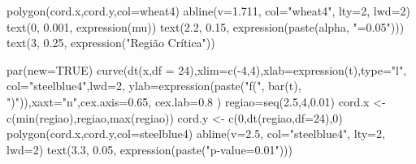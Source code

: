 \documentclass[
  letterpaper,
  DIV=11,
  numbers=noendperiod]{scrartcl}
\newenvironment{Shaded}{\begin{snugshade}}{\end{snugshade}}
\newcommand{\AttributeTok}[1]{\textcolor[rgb]{0.40,0.45,0.13}{#1}}
\newcommand{\ConstantTok}[1]{\textcolor[rgb]{0.56,0.35,0.01}{#1}}
\newcommand{\DecValTok}[1]{\textcolor[rgb]{0.68,0.00,0.00}{#1}}
\newcommand{\FloatTok}[1]{\textcolor[rgb]{0.68,0.00,0.00}{#1}}
\newcommand{\FunctionTok}[1]{\textcolor[rgb]{0.28,0.35,0.67}{#1}}
\newcommand{\NormalTok}[1]{\textcolor[rgb]{0.00,0.23,0.31}{#1}}
\newcommand{\OtherTok}[1]{\textcolor[rgb]{0.00,0.23,0.31}{#1}}
\newcommand{\SpecialCharTok}[1]{\textcolor[rgb]{0.37,0.37,0.37}{#1}}
\newcommand{\StringTok}[1]{\textcolor[rgb]{0.13,0.47,0.30}{#1}}
\begin{document}
\begin{Shaded}
\begin{Highlighting}[]
\FunctionTok{polygon}\NormalTok{(cord.x,cord.y,}\AttributeTok{col=}\StringTok{\textquotesingle{}wheat4\textquotesingle{}}\NormalTok{)}
\FunctionTok{abline}\NormalTok{(}\AttributeTok{v=}\FloatTok{1.711}\NormalTok{, }\AttributeTok{col=}\StringTok{"wheat4"}\NormalTok{, }\AttributeTok{lty=}\DecValTok{2}\NormalTok{, }\AttributeTok{lwd=}\DecValTok{2}\NormalTok{)}
\FunctionTok{text}\NormalTok{(}\DecValTok{0}\NormalTok{, }\FloatTok{0.001}\NormalTok{, }\FunctionTok{expression}\NormalTok{(mu))}
\FunctionTok{text}\NormalTok{(}\FloatTok{2.2}\NormalTok{, }\FloatTok{0.15}\NormalTok{, }\FunctionTok{expression}\NormalTok{(}\FunctionTok{paste}\NormalTok{(alpha, }\StringTok{"=0.05"}\NormalTok{)))}
\FunctionTok{text}\NormalTok{(}\DecValTok{3}\NormalTok{, }\FloatTok{0.25}\NormalTok{, }\FunctionTok{expression}\NormalTok{(}\StringTok{"Região Crítica"}\NormalTok{))}

\FunctionTok{par}\NormalTok{(}\AttributeTok{new=}\ConstantTok{TRUE}\NormalTok{)}
\FunctionTok{curve}\NormalTok{(}\FunctionTok{dt}\NormalTok{(x,}\AttributeTok{df =} \DecValTok{24}\NormalTok{),}\AttributeTok{xlim=}\FunctionTok{c}\NormalTok{(}\SpecialCharTok{{-}}\DecValTok{4}\NormalTok{,}\DecValTok{4}\NormalTok{),}\AttributeTok{xlab=}\FunctionTok{expression}\NormalTok{(t),}\AttributeTok{type=}\StringTok{"l"}\NormalTok{,}
      \AttributeTok{col=}\StringTok{"steelblue4"}\NormalTok{,}\AttributeTok{lwd=}\DecValTok{2}\NormalTok{, }\AttributeTok{ylab=}\FunctionTok{expression}\NormalTok{(}\FunctionTok{paste}\NormalTok{(}\StringTok{"f("}\NormalTok{, }\FunctionTok{bar}\NormalTok{(t),}
      \StringTok{")"}\NormalTok{)),}\AttributeTok{xaxt=}\StringTok{"n"}\NormalTok{,}\AttributeTok{cex.axis=}\FloatTok{0.65}\NormalTok{, }\AttributeTok{cex.lab=}\FloatTok{0.8}\NormalTok{ )  }
\NormalTok{regiao}\OtherTok{=}\FunctionTok{seq}\NormalTok{(}\FloatTok{2.5}\NormalTok{,}\DecValTok{4}\NormalTok{,}\FloatTok{0.01}\NormalTok{)}
\NormalTok{cord.x }\OtherTok{\textless{}{-}} \FunctionTok{c}\NormalTok{(}\FunctionTok{min}\NormalTok{(regiao),regiao,}\FunctionTok{max}\NormalTok{(regiao))}
\NormalTok{cord.y }\OtherTok{\textless{}{-}} \FunctionTok{c}\NormalTok{(}\DecValTok{0}\NormalTok{,}\FunctionTok{dt}\NormalTok{(regiao,}\AttributeTok{df=}\DecValTok{24}\NormalTok{),}\DecValTok{0}\NormalTok{)}
\FunctionTok{polygon}\NormalTok{(cord.x,cord.y,}\AttributeTok{col=}\StringTok{\textquotesingle{}steelblue4\textquotesingle{}}\NormalTok{)}
\FunctionTok{abline}\NormalTok{(}\AttributeTok{v=}\FloatTok{2.5}\NormalTok{, }\AttributeTok{col=}\StringTok{"steelblue4"}\NormalTok{, }\AttributeTok{lty=}\DecValTok{2}\NormalTok{, }\AttributeTok{lwd=}\DecValTok{2}\NormalTok{)}
\FunctionTok{text}\NormalTok{(}\FloatTok{3.3}\NormalTok{, }\FloatTok{0.05}\NormalTok{, }\FunctionTok{expression}\NormalTok{(}\FunctionTok{paste}\NormalTok{(}\StringTok{"p{-}value=0.01"}\NormalTok{)))}
\end{Highlighting}
\end{Shaded}
\end{document}
